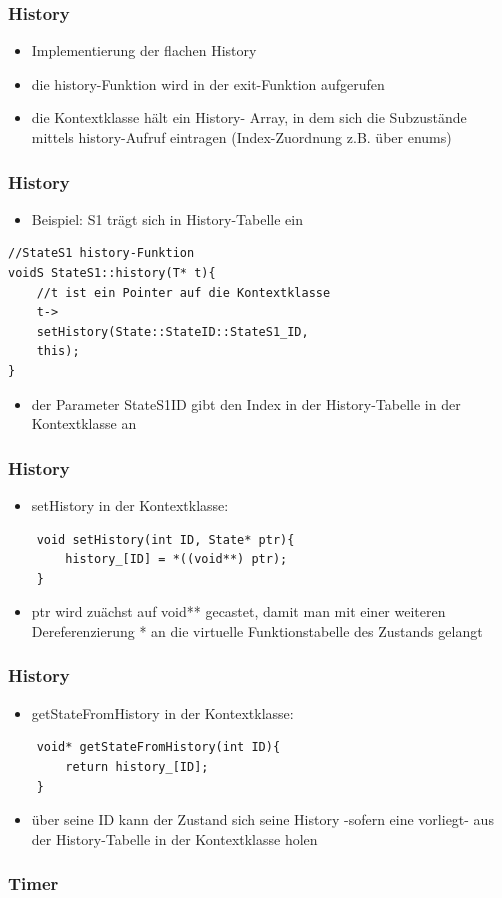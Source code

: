 \documentclass{beamer}
\begin{document}
\begin{frame}
	\frametitle{History}
	\begin{itemize}
		\item Implementierung der flachen History
		\item die history-Funktion  wird in der exit-Funktion aufgerufen
		\item die Kontextklasse h\"alt ein History- Array,
		 in dem sich die Subzust\"ande mittels history-Aufruf eintragen (Index-Zuordnung z.B. \"uber enums)
	\end{itemize}
\end{frame}

\begin{frame}[fragile]
	\frametitle{History}
	\begin{itemize}
		\item Beispiel: S1 tr\"agt sich in History-Tabelle ein
	\end{itemize}
	\begin{lstlisting}
//StateS1 history-Funktion
voidS StateS1::history(T* t){
    //t ist ein Pointer auf die Kontextklasse
    t->
    setHistory(State::StateID::StateS1_ID,
    this);
}
	\end{lstlisting}
	\begin{itemize}
		\item der Parameter StateS1ID gibt den Index in der History-Tabelle in der Kontextklasse an
	\end{itemize}
\end{frame}

\begin{frame}[fragile]
	\frametitle{History}
	\begin{itemize}
		\item setHistory in der Kontextklasse:
	\end{itemize}
	\begin{lstlisting}
    void setHistory(int ID, State* ptr){
        history_[ID] = *((void**) ptr);
    }
	\end{lstlisting}
	\begin{itemize}
		\item ptr wird zu\"achst auf void** gecastet, damit man mit einer weiteren Dereferenzierung * an die virtuelle Funktionstabelle des Zustands gelangt 
	\end{itemize}
\end{frame}

\begin{frame}[fragile]
	\frametitle{History}
	\begin{itemize}
		\item getStateFromHistory in der Kontextklasse:
	\end{itemize}
	\begin{lstlisting}
    void* getStateFromHistory(int ID){
        return history_[ID];
    }
	\end{lstlisting}
	\begin{itemize}
		\item \"uber seine ID kann der Zustand sich seine History -sofern eine vorliegt- aus der History-Tabelle in der Kontextklasse holen
	\end{itemize}
\end{frame}


\begin{frame}
 \frametitle{Timer}
\end{frame}
\end{document}
